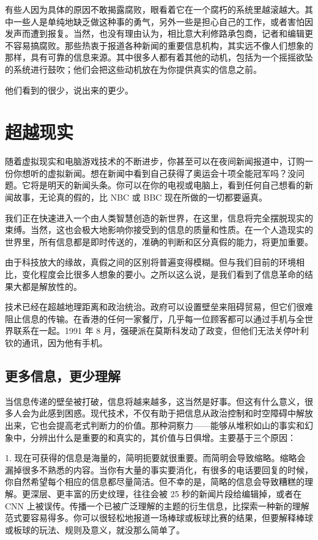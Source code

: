 有些人因为具体的原因不敢揭露腐败，眼看着它在一个腐朽的系统里越滚越大。其中一些人是单纯地缺乏做这种事的勇气，另外一些是担心自己的工作，或者害怕因发声而遭到报复。当然，也没有理由认为，相比意大利修路承包商，记者和编辑更不容易搞腐败。那些热衷于报道各种新闻的重要信息机构，其实远不像人们想象的那样，具有可靠的信息来源。其中很多人都有着其他的动机，包括为一个摇摇欲坠的系统进行鼓吹；他们会把这些动机放在为你提供真实的信息之前。

他们看到的很少，说出来的更少。

\section{超越现实}
随着虚拟现实和电脑游戏技术的不断进步，你甚至可以在夜间新闻报道中，订购一份你想听的虚拟新闻。想在新闻中看到自己获得了奥运会十项全能冠军吗？没问题。它将是明天的新闻头条。你可以在你的电视或电脑上，看到任何自己想看的新闻故事，无论真的假的，比 NBC 或 BBC 现在所做的一切都要逼真。

我们正在快速进入一个由人类智慧创造的新世界，在这里，信息将完全摆脱现实的束缚。当然，这也会极大地影响你接受到的信息的质量和性质。在一个人造现实的世界里，所有信息都是即时传送的，准确的判断和区分真假的能力，将更加重要。

由于科技放大的缘故，真假之间的区别将普遍变得模糊。但与我们目前的环境相比，变化程度会比很多人想象的要小。之所以这么说，是我们看到了信息革命的结果大都是解放性的。

技术已经在超越地理距离和政治统治。政府可以设置壁垒来阻碍贸易，但它们很难阻止信息的传输。在香港的任何一家餐厅，几乎每一位顾客都可以通过手机与全世界联系在一起。1991 年 8 月，强硬派在莫斯科发动了政变，但他们无法关停叶利钦的通讯，因为他有手机。

\subsection{更多信息，更少理解}
当信息传递的壁垒被打破，信息将越来越多，这当然是好事。但这有什么意义，很多人会为此感到困惑。现代技术，不仅有助于把信息从政治控制和时空障碍中解放出来，它也会提高老式判断力的价值。那种洞察力——能够从堆积如山的事实和幻象中，分辨出什么是重要的和真实的，其价值与日俱增。主要基于三个原因：

1. 现在可获得的信息是海量的，简明扼要就很重要。而简明会导致缩略。缩略会漏掉很多不熟悉的内容。当你有大量的事实要消化，有很多的电话要回复的时候，你自然希望每个相应的信息都尽量简洁。但不幸的是，简略的信息会导致糟糕的理解。更深层、更丰富的历史纹理，往往会被 25 秒的新闻片段给编辑掉，或者在 CNN 上被误传。传播一个已被广泛理解的主题的衍生信息，比探索一种新的理解范式要容易得多。你可以很轻松地报道一场棒球或板球比赛的结果，但要解释棒球或板球的玩法、规则及意义，就没那么简单了。


